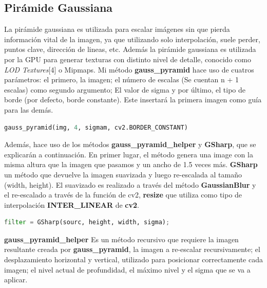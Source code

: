 \documentclass{article}
\begin{document}
\subsection{Pirámide Gaussiana}
La pirámide gaussiana es utilizada para escalar imágenes sin que pierda información vital de la imagen, ya que utilizando solo interpolación, suele perder, puntos clave, dirección de lineas, etc.
\newline
\newline
Además la pirámide gaussiana es utilizada por la GPU para generar texturas con distinto nivel de detalle, conocido como \textit{LOD Textures}[4] o Mipmaps.
\newline
\newline
Mi método \textbf{gauss\_pyramid} hace uso de cuatros parámetros: el primero, la imagen; el número de escalas (Se cuentan n + 1 escalas) como segundo argumento; El valor de sigma y por último, el tipo de borde (por defecto, borde constante). Este insertará la primera imagen como guía para las demás.
\begin{lstlisting}[language=Python]
gauss_pyramid(img, 4, sigmam, cv2.BORDER_CONSTANT)
\end{lstlisting}
Además, hace uso de los métodos \textbf{gauss\_pyramid\_helper} y \textbf{GSharp}, que se explicarán a continuación. En primer lugar, el método genera una image con la misma altura que la imagen que pasamos y un ancho de 1.5 veces más.
\newline
\newline
\textbf{GSharp} un método que devuelve la imagen suavizada y luego re-escalada al tamaño (width, height). El suavizado es realizado a través del método \textbf{GaussianBlur} y el re-escalado a través de la función de cv2, \textbf{resize} que utiliza como tipo de interpolación \textbf{INTER\_LINEAR} de \textbf{cv2}.
\begin{lstlisting}[language=Python]
filter = GSharp(sourc, height, width, sigma);
\end{lstlisting}
\textbf{gauss\_pyramid\_helper} Es un método recursivo que requiere la imagen resultante creada por \textbf{gauss\_pyramid}, la imagen a re-escalar recursivamente; el desplazamiento horizontal y vertical, utilizado para posicionar correctamente cada imagen; el nivel actual de profundidad, el máximo nivel y el sigma que se va a aplicar.

\newpage
\end{document}

